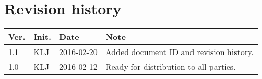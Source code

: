 \chapter*{Revision history}
\label{app:rev_his}

\renewcommand\arraystretch{1.5}
\begin{tabular}{b{1cm} b{1cm} b{2cm} b{8cm}}
    \textbf{Ver.} & \textbf{Init.} & \textbf{Date} & \textbf{Note} \\
    \hline
    1.1 & KLJ & 2016-02-20 & Added document ID and revision history. \\
    \hline
    1.0 & KLJ & 2016-02-12 & Ready for distribution to all parties. \\
\end{tabular}
\renewcommand\arraystretch{1}